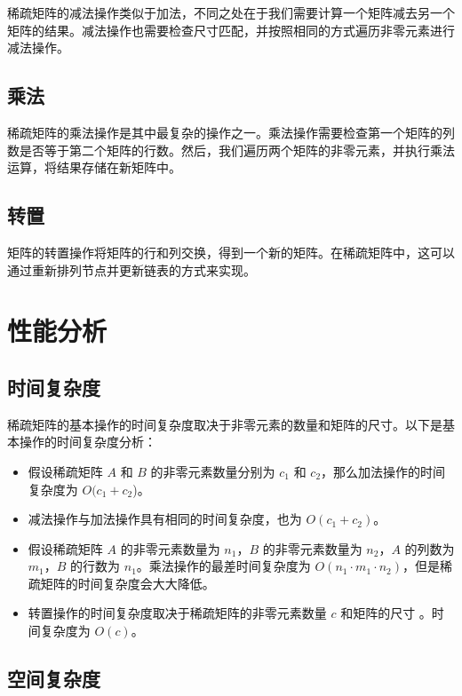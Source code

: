 \documentclass[12pt]{article}
\begin{document}
稀疏矩阵的减法操作类似于加法，不同之处在于我们需要计算一个矩阵减去另一个矩阵的结果。减法操作也需要检查尺寸匹配，并按照相同的方式遍历非零元素进行减法操作。

\subsection{乘法}

稀疏矩阵的乘法操作是其中最复杂的操作之一。乘法操作需要检查第一个矩阵的列数是否等于第二个矩阵的行数。然后，我们遍历两个矩阵的非零元素，并执行乘法运算，将结果存储在新矩阵中。

\subsection*{转置}

矩阵的转置操作将矩阵的行和列交换，得到一个新的矩阵。在稀疏矩阵中，这可以通过重新排列节点并更新链表的方式来实现。

\newpage

\section{性能分析}

\subsection{时间复杂度}

稀疏矩阵的基本操作的时间复杂度取决于非零元素的数量和矩阵的尺寸。以下是基本操作的时间复杂度分析：

\begin{itemize}
    \item 假设稀疏矩阵 $A$ 和 $B$ 的非零元素数量分别为 $c_1$ 和 $c_2$，那么加法操作的时间复杂度为 $O(c_1 + c_2$)。
    \item 减法操作与加法操作具有相同的时间复杂度，也为 $O(c_1 + c_2)$。
    \item 假设稀疏矩阵 $A$ 的非零元素数量为 $n_1$，$B$ 的非零元素数量为 $n_2$，$A$ 的列数为 $m_1$，$B$ 的行数为 $n_1$。乘法操作的最差时间复杂度为 $O(n_1 \cdot m_1\cdot n_2)$，但是稀疏矩阵的时间复杂度会大大降低。
    \item 转置操作的时间复杂度取决于稀疏矩阵的非零元素数量 $c$ 和矩阵的尺寸 。时间复杂度为 $O(c)$。
\end{itemize}

\subsection{空间复杂度}
\end{document}

